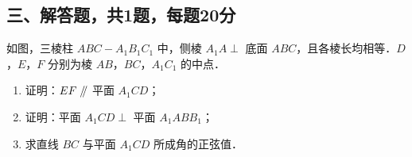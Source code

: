 \vspace{2em}
\subsection{三、解答题，共1题，每题20分}

\begin{example}[\bkstar{3}{5}]
如图，三棱柱 $ABC-A_1B_1C_1$ 中，侧棱 $A_1A\perp$ 底面 $ABC$，且各棱长均相等．$D$，$E$，$F$ 分别为棱 $AB$，$BC$，$A_1C_1$ 的中点．
\begin{enumerate}
    \item[(1)] 证明：$EF\mathrel{/\mkern-5mu/}$ 平面 $A_1CD$；
    \item[(2)] 证明：平面 $A_1CD\perp$ 平面 $A_1ABB_1$；
    \item[(3)] 求直线 $BC$ 与平面 $A_1CD$ 所成角的正弦值．
\end{enumerate}
\end{example}
